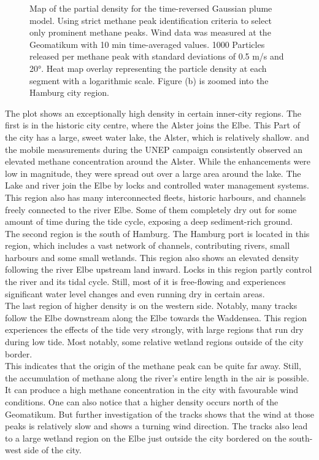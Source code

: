 \begin{figure}
\begin{subfigure}{.5\textwidth}
  \caption{}
  \label{TransportmodelStrictPeaksZoom}
\end{subfigure}
\caption[Transport Model]{Map of the partial density for the time-reversed Gaussian plume model. Using strict methane peak identification criteria to select only prominent methane peaks. Wind data was measured at the Geomatikum with 10 min time-averaged values. 1000 Particles released per methane peak with standard deviations of 0.5 m/s and 20°. Heat map overlay representing the particle density at each segment with a logarithmic scale. Figure (b) is zoomed into the Hamburg city region.}
\label{TransportmodelStrictPeaks}
\end{figure}
The plot shows an exceptionally high density in certain inner-city regions. 
The first is in the historic city centre, where the Alster joins the Elbe. This Part of the city has a large, sweet water lake, the Alster, which is relatively shallow. \cite{Maazallahi.2020} and the mobile measurements during the UNEP campaign consistently observed an elevated methane concentration around the Alster. While the enhancements were low in magnitude, they were spread out over a large area around the lake. The Lake and river join the Elbe by locks and controlled water management systems. This region also has many interconnected fleets, historic harbours, and channels freely connected to the river Elbe. Some of them completely dry out for some amount of time during the tide cycle, exposing a deep sediment-rich ground. \\
The second region is the south of Hamburg. The Hamburg port is located in this region, which includes a vast network of channels, contributing rivers, small harbours and some small wetlands. This region also shows an elevated density following the river Elbe upstream land inward. Locks in this region partly control the river and its tidal cycle. Still, most of it is free-flowing and experiences significant water level changes and even running dry in certain areas.\\
The last region of higher density is on the western side. Notably, many tracks follow the Elbe downstream along the Elbe towards the Waddensea. This region experiences the effects of the tide very strongly, with large regions that run dry during low tide. Most notably, some relative wetland regions outside of the city border.\\
This indicates that the origin of the methane peak can be quite far away. Still, the accumulation of methane along the river's entire length in the air is possible. It can produce a high methane concentration in the city with favourable wind conditions. One can also notice that a higher density occurs north of the Geomatikum. But further investigation of the tracks shows that the wind at those peaks is relatively slow and shows a turning wind direction. The tracks also lead to a large wetland region on the Elbe just outside the city bordered on the south-west side of the city.\\
